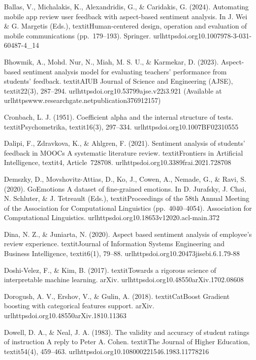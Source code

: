 Ballas, V., Michalakis, K., Alexandridis, G., & Caridakis, G. (2024). Automating mobile app review user feedback with aspect-based sentiment analysis. In J. Wei & G. Margetis (Eds.), textit{Human-centered design, operation and evaluation of mobile communications} (pp.~179--193). Springer. url{httpsdoi.org10.1007978-3-031-60487-4_14}

Bhowmik, A., Mohd. Nur, N., Miah, M. S. U., & Karmekar, D. (2023). Aspect-based sentiment analysis model for evaluating teachers' performance from students' feedback. textit{AIUB Journal of Science and Engineering (AJSE)}, textit{22}(3), 287--294. url{httpsdoi.org10.53799ajse.v22i3.921} (Available at url{httpswww.researchgate.netpublication376912157})

Cronbach, L. J. (1951). Coefficient alpha and the internal structure of tests. textit{Psychometrika}, textit{16}(3), 297--334. url{httpsdoi.org10.1007BF02310555}

‌Dalipi, F., Zdravkova, K., & Ahlgren, F. (2021). Sentiment analysis of students' feedback in MOOCs A systematic literature review. textit{Frontiers in Artificial Intelligence}, textit{4}, Article~728708. url{httpsdoi.org10.3389frai.2021.728708}

Demszky, D., Movshovitz-Attias, D., Ko, J., Cowen, A., Nemade, G., & Ravi, S. (2020). GoEmotions A dataset of fine-grained emotions. In D. Jurafsky, J. Chai, N. Schluter, & J. Tetreault (Eds.), textit{Proceedings of the 58th Annual Meeting of the Association for Computational Linguistics} (pp.~4040--4054). Association for Computational Linguistics. url{httpsdoi.org10.18653v12020.acl-main.372}

Dina, N. Z., & Juniarta, N. (2020). Aspect based sentiment analysis of employee's review experience. textit{Journal of Information Systems Engineering and Business Intelligence}, textit{6}(1), 79--88. url{httpsdoi.org10.20473jisebi.6.1.79-88}

Doshi-Velez, F., & Kim, B. (2017). textit{Towards a rigorous science of interpretable machine learning}. arXiv. url{httpsdoi.org10.48550arXiv.1702.08608}

Dorogush, A. V., Ershov, V., & Gulin, A. (2018). textit{CatBoost Gradient boosting with categorical features support}. arXiv. url{httpsdoi.org10.48550arXiv.1810.11363}

Dowell, D. A., & Neal, J. A. (1983). The validity and accuracy of student ratings of instruction A reply to Peter A. Cohen. textit{The Journal of Higher Education}, textit{54}(4), 459--463. url{httpsdoi.org10.108000221546.1983.11778216}

